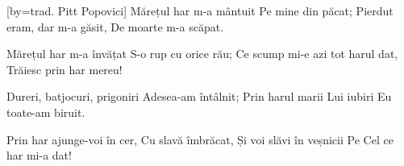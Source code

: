 [by={trad. Pitt Popovici}]
\beginverse
Mărețul har m-a mântuit
Pe mine din păcat;
Pierdut eram, dar m-a găsit,
De moarte m-a scăpat.
\endverse

\beginverse
Mărețul har m-a învățat
S-o rup cu orice rău;
Ce scump mi-e azi tot harul dat,
Trăiesc prin har mereu!
\endverse

\beginverse
Dureri, batjocuri, prigoniri
Adesea-am întâlnit;
Prin harul marii Lui iubiri
Eu toate-am biruit.
\endverse

\beginverse
Prin har ajunge-voi în cer,
Cu slavă îmbrăcat,
Și voi slăvi în veșnicii
Pe Cel ce har mi-a dat!
\endverse
\endsong
